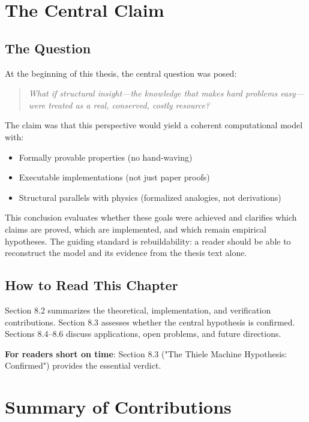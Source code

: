 
\section{The Central Claim}

\subsection{The Question}

At the beginning of this thesis, the central question was posed:
\begin{quote}
    \textit{What if structural insight---the knowledge that makes hard problems easy---were treated as a real, conserved, costly resource?}
\end{quote}

The claim was that this perspective would yield a coherent computational model with:
\begin{itemize}
    \item Formally provable properties (no hand-waving)
    \item Executable implementations (not just paper proofs)
    \item Structural parallels with physics (formalized analogies, not derivations)
\end{itemize}

This conclusion evaluates whether these goals were achieved and clarifies which claims are proved, which are implemented, and which remain empirical hypotheses. The guiding standard is rebuildability: a reader should be able to reconstruct the model and its evidence from the thesis text alone.

\subsection{How to Read This Chapter}

Section 8.2 summarizes the theoretical, implementation, and verification contributions. Section 8.3 assesses whether the central hypothesis is confirmed. Sections 8.4--8.6 discuss applications, open problems, and future directions.

\textbf{For readers short on time}: Section 8.3 ("The Thiele Machine Hypothesis: Confirmed") provides the essential verdict.

\section{Summary of Contributions}

